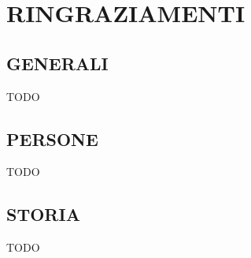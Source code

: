 \section*{RINGRAZIAMENTI}
\label{sec:acknowledgements}

\subsection*{GENERALI}
\label{sec:general}
TODO

\subsection*{PERSONE}
\label{sec:people}
TODO

\subsection*{STORIA}
\label{sec:history}
TODO
